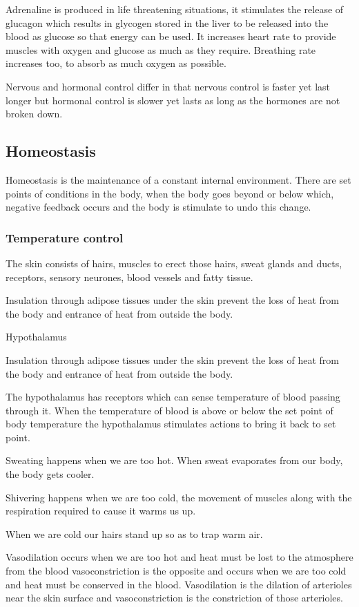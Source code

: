 Adrenaline is produced in life threatening situations, it stimulates the release of glucagon
which results in glycogen stored in the liver to be released into the blood as glucose so that 
energy can be used. It increases heart rate to provide muscles with oxygen and glucose as much as
they require. Breathing rate increases too, to absorb as much oxygen as possible.

Nervous and hormonal control differ in that nervous control is faster yet last longer but hormonal
control is slower yet lasts as long as the hormones are not broken down.

\subsection{Homeostasis}
Homeostasis is the maintenance of a constant internal environment. There are set points of 
conditions in the body, when the body goes beyond or below which, negative feedback occurs and the
body is stimulate to undo this change.

\subsubsection{Temperature control}
The skin consists of hairs, muscles to erect those hairs, sweat glands and ducts, receptors, 
sensory neurones, blood vessels and fatty tissue.

Insulation through adipose tissues under the skin prevent the loss of heat from the body and
entrance of heat from outside the body.

Hypothalamus

Insulation through adipose tissues under the skin prevent the loss of heat from the body and
entrance of heat from outside the body.

The hypothalamus has receptors which can sense temperature of blood passing through it. When the
temperature of blood is above or below the set point of body temperature the hypothalamus 
stimulates actions to bring it back to set point.

Sweating happens when we are too hot. When sweat evaporates from our body, the body gets cooler.

Shivering happens when we are too cold, the movement of muscles along with the respiration required
to cause it warms us up.

When we are cold our hairs stand up so as to trap warm air.

Vasodilation occurs when we are too hot and heat must be lost to the atmosphere from the blood
vasoconstriction is the opposite and occurs when we are too cold and heat must be conserved in the
blood. Vasodilation is the dilation of arterioles near the skin surface and vasoconstriction is
the constriction of those arterioles.

